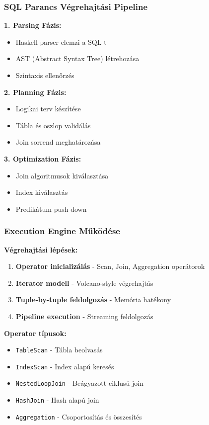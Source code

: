 \documentclass{beamer}
\begin{document}
\begin{frame}
\frametitle{SQL Parancs Végrehajtási Pipeline}

\textbf{1. Parsing Fázis:}
\begin{itemize}
    \item Haskell parser elemzi a SQL-t
    \item AST (Abstract Syntax Tree) létrehozása
    \item Szintaxis ellenőrzés
\end{itemize}

\vspace{0.3cm}
\textbf{2. Planning Fázis:}
\begin{itemize}
    \item Logikai terv készítése
    \item Tábla és oszlop validálás
    \item Join sorrend meghatározása
\end{itemize}

\vspace{0.3cm}
\textbf{3. Optimization Fázis:}
\begin{itemize}
    \item Join algoritmusok kiválasztása
    \item Index kiválasztás
    \item Predikátum push-down
\end{itemize}

\end{frame}

\begin{frame}
\frametitle{Execution Engine Működése}

\textbf{Végrehajtási lépések:}
\begin{enumerate}
    \item \textbf{Operator inicializálás} - Scan, Join, Aggregation operátorok
    \item \textbf{Iterator modell} - Volcano-style végrehajtás
    \item \textbf{Tuple-by-tuple feldolgozás} - Memória hatékony
    \item \textbf{Pipeline execution} - Streaming feldolgozás
\end{enumerate}

\vspace{0.5cm}
\textbf{Operator típusok:}
\begin{itemize}
    \item \texttt{TableScan} - Tábla beolvasás
    \item \texttt{IndexScan} - Index alapú keresés
    \item \texttt{NestedLoopJoin} - Beágyazott ciklusú join
    \item \texttt{HashJoin} - Hash alapú join
    \item \texttt{Aggregation} - Csoportosítás és összesítés
\end{itemize}

\end{frame}
\end{document}
